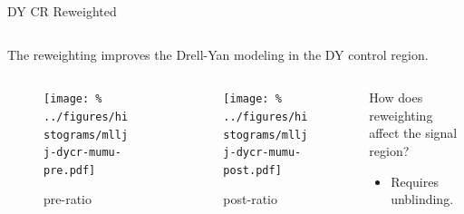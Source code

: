 \documentclass[aspectratio=169]{beamer}
\begin{document}
\begin{frame}{DY CR Reweighted}
  \begin{columns}
    \begin{column}{0.69\textwidth}
      \begin{block}{}
        \centering
        The reweighting improves the Drell-Yan modeling in the DY control region.
      \end{block}
    \end{column}
    \begin{column}{0.3\textwidth}
      \centering
      \resizebox{0.9\columnwidth}{!}{%
      
      }
    \end{column}
  \end{columns}
  \begin{columns}
    \begin{column}{0.35\textwidth}
      \begin{figure}
        \texttt{[image: \%
        ../figures/histograms/mlljj-dycr-mumu-pre.pdf]}
        \caption{pre-ratio}
      \end{figure}
    \end{column}
    \begin{column}{0.35\textwidth}
      \begin{figure}
        \texttt{[image: \%
        ../figures/histograms/mlljj-dycr-mumu-post.pdf]}
        \caption{post-ratio}
      \end{figure}
    \end{column}
    \begin{column}{0.3\textwidth}
      \begin{block}{}
        How does reweighting affect the signal region?
          \begin{itemize}
            \footnotesize
            \item Requires unblinding.
          \end{itemize}
      \end{block}
    \end{column}
  \end{columns}
\end{frame}
\end{document}
